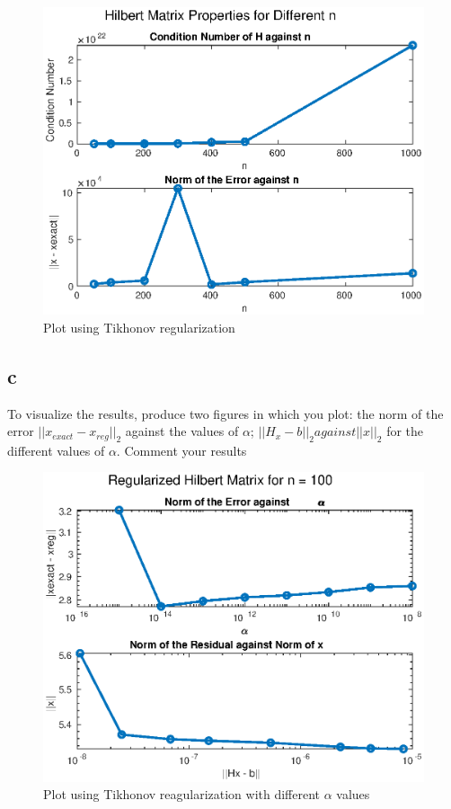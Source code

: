 \documentclass[unicode,11pt,a4paper,oneside,numbers=endperiod,openany]{scrartcl}
\begin{document}
\begin{figure}[H]
    \centering
    \caption{Plot using Tikhonov regularization}
    \label{fig:ex5b}
    \includegraphics[width=\textwidth]{ex5b.eps}
\end{figure}

\subsection*{c}
To visualize the results, produce two figures in which you plot:
the norm of the error $||x_{exact} - x_{reg}||_2$ against the values of $\alpha$; $||H_x - b||_2 against ||x||_2$
for the different values of $\alpha$. Comment your results

\begin{figure}[H]
    \centering
    \caption{Plot using Tikhonov reagularization with different $\alpha$ values}
    \label{fig:ex5c}
    \includegraphics[width=\textwidth]{ex5c.eps}
\end{figure}
\end{document}
